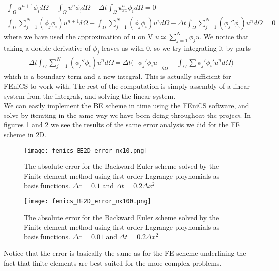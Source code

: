 \documentclass[a4paper,english, 10pt, twoside]{article}
\renewcommand{\d}{\partial}
\begin{document}
\begin{align*}
 \int_\Omega u^{n+1}\phi_id\Omega - \int_\Omega u^{n}\phi_id\Omega -\Delta t \int_\Omega u^{n}_{xx}\phi_id\Omega = 0 \\
 \int_\Omega \sum\limits_{j=1}^N(\phi_j\phi_i)u^{n+1}d\Omega - \int_\Omega \sum\limits_{j=1}^N(\phi_j\phi_i)u^{n}d\Omega -
 \Delta t \int_\Omega \sum\limits_{j=1}^N(\phi_j''\phi_i)u^{n}d\Omega = 0 
\end{align*}
where we have used the approximation of u on V $u\simeq\sum\limits_{j=1}^N\phi_ju$. We notice that taking a double derivative of $\phi_j$ leaves us 
with 0, so we try integrating it by parts
\begin{align*}
 - \Delta t \int_\Omega \sum\limits_{j=1}^N(\phi_j''\phi_i)u^{n}d\Omega = \Delta t\big([\phi_j'\phi_iu]_{\d\Omega} -\int_\Omega \sum 
 \phi_j'\phi_i'u^nd\Omega\big)
\end{align*}
which is a boundary term and a new integral. This is actually sufficient for FEniCS to work with. The rest of the computation is simply assembly of a 
linear system from the integrals, and solving the linear system. \\
We can easily implement the BE scheme in time using the FEniCS software, and solve by iterating in the same way we have been doing throughout 
the project. In figures \ref{fenics_n10} and \ref{fenics_n100} we see the results of the same error analysis we did for the FE scheme in 2D.
\begin{figure}[H]
 \centering
 \texttt{[image: fenics\_BE2D\_error\_nx10.png]}
 \caption{The absolute error for the Backward Euler scheme solved by the Finite element method using first order Lagrange ploynomials as basis 
 functions. $\Delta x = 0.1$ and $\Delta t = 0.2\Delta x^2$}
 \label{fenics_n10}
\end{figure}
\begin{figure}[H]
 \centering
 \texttt{[image: fenics\_BE2D\_error\_nx100.png]}
 \caption{The absolute error for the Backward Euler scheme solved by the Finite element method using first order Lagrange ploynomials as basis 
 functions. $\Delta x = 0.01$ and $\Delta t = 0.2\Delta x^2$}
 \label{fenics_n100}
\end{figure}
Notice that the error is basically the same as for the FE scheme underlining the fact that finite elements are best suited for the more 
complex problems.
\end{document}
